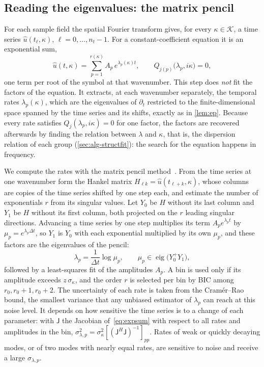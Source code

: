 \documentclass[11pt]{article}
\theoremstyle{plain}
\theoremstyle{definition}
\theoremstyle{remark}
\newcommand{\sigbin}{\sigma_{\kappa}}       %
\begin{document}


\subsection{Reading the eigenvalues: the matrix pencil}\label{sec:alg-pencil}
For each sample field the spatial Fourier transform gives, for every $\kappa\in\mathcal K$, a time series
$\hat u(t_\ell,\kappa)$, $\ell=0,\dots,n_t-1$. For a constant-coefficient equation it is an exponential sum,
\begin{equation}\label{eq:expsum}
  \hat u(t,\kappa)=\sum_{p=1}^{r(\kappa)}A_p\,e^{\lambda_p(\kappa)t},\qquad Q_{j(p)}\big(\lambda_p,i\kappa\big)=0,
\end{equation}
one term per root of the symbol at that wavenumber. This step does \emph{not} fit the factors of the equation. It
extracts, at each wavenumber separately, the temporal rates $\lambda_p(\kappa)$, which are the eigenvalues of $\partial_t$
restricted to the finite-dimensional space spanned by the time series and its shifts, exactly as in \cref{lem:ep}.
Because every rate satisfies $Q_j(\lambda_p,i\kappa)=0$ for one factor, the factors are recovered afterwards by finding
the relation between $\lambda$ and $\kappa$, that is, the dispersion relation of each group (\cref{sec:alg-structfit}):
the search for the equation happens in frequency.

We compute the rates with the matrix pencil method~\cite{HuaSar90}. From the time series at one wavenumber form the Hankel matrix $H_{\ell k}=\hat u(t_{\ell+k},\kappa)$, whose columns are copies of the time series shifted by
one step each, and estimate the number of exponentials $r$ from its singular values. Let $Y_0$ be $H$ without its last
column and $Y_1$ be $H$ without its first column, both projected on the $r$ leading singular directions. Advancing a
time series by one step multiplies its term $A_pe^{\lambda_pt}$ by $\mu_p=e^{\lambda_p\Delta t}$, so $Y_1$ is $Y_0$ with
each exponential multiplied by its own $\mu_p$, and these factors are the eigenvalues of the pencil:
\begin{equation}\label{eq:pencil}
  \lambda_p=\frac{1}{\Delta t}\log\mu_p,\qquad \mu_p\in\operatorname{eig}\big(Y_0^{+}Y_1\big),
\end{equation}
followed by a least-squares fit of the amplitudes $A_p$. A bin is used only if its amplitude exceeds
$z\,\sigbin$, and the order $r$ is selected per bin by BIC among $r_0,r_0+1,r_0+2$. The uncertainty of each rate is
taken from the Cram\'er--Rao bound, the smallest variance that any unbiased estimator of $\lambda_p$ can reach at this
noise level. It depends on how sensitive the time series is to a change of each parameter: with $\mathsf J$ the
Jacobian of~\eqref{eq:expsum} with respect to all rates and amplitudes in the bin,
$\sigma_{\lambda,p}^2=\sigbin^2[(\mathsf J^H\mathsf J)^{-1}]_{pp}$. Rates of weak or quickly decaying modes, or of two modes with
nearly equal rates, are sensitive to noise and receive a large $\sigma_{\lambda,p}$.
\end{document}
